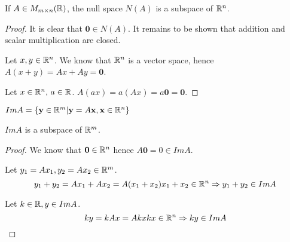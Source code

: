 \documentclass[a4paper,10pt]{article}
\begin{document}
\begin{prop}
	If $A \in M_{m \times n}(\mathbb{R})$, the null space $N(A)$ is a
	subspace of $\mathbb{R}^n$.
\end{prop}

\begin{proof}
	It is clear that $\mathbf{0} \in N(A)$. It remains to be shown
	that addition and scalar multiplication are closed.

	Let $x,y \in \mathbb{R}^n$. We know that $\mathbb{R}^n$ is a vector space,
	hence $A(x+y) = Ax + Ay = \mathbf{0}$.

	Let $x \in \mathbb{R}^n, \, a \in \mathbb{R}$. $A(ax) = a(Ax) = a\mathbf{0} = \mathbf{0}$.
\end{proof}

\begin{defn}
	$Im A = \{ \mathbf{y} \in \mathbb{R}^m | \mathbf{y} = A\mathbf{x}, \mathbf{x} \in \mathbb{R}^n \}$
\end{defn}

\begin{prop}
	$Im A$ is a subspace of $\mathbb{R}^m$.
\end{prop}

\begin{proof}
	We know that $\mathbf{0} \in \mathbb{R}^n$ hence $A\mathbf{0} = 0 \in Im A$.

	Let $y_1 = Ax_1, y_2 = Ax_2 \in \mathbb{R}^m$.
	\[
		y_1 + y_2 = Ax_1 + Ax_2 = A(x_1 + x_2)
		x_1 + x_2 \in \mathbb{R}^n \Rightarrow y_1 + y_2 \in Im A
	\]

	Let $k \in \mathbb{R}, y \in Im A$.
	\[
		ky = kAx = Akx
		kx \in \mathbb{R}^n \Rightarrow ky \in Im A
	\]
\end{proof}
\end{document}
